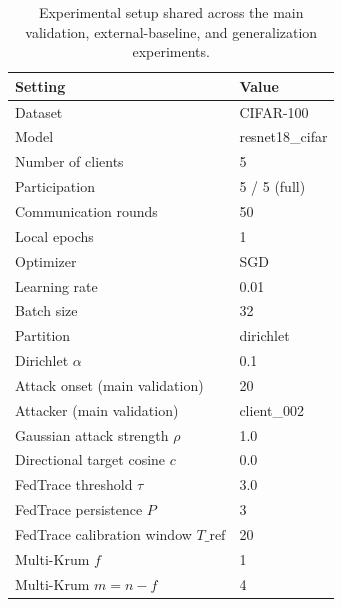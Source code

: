 \begin{table}[t]
\centering
\caption{Experimental setup shared across the main validation, external-baseline, and generalization experiments.}
\label{tab:setup}
\begin{tabular}{lX}
\toprule
Setting & Value \\
\midrule
Dataset & CIFAR-100 \\
Model & resnet18\_cifar \\
Number of clients & 5 \\
Participation & 5 / 5 (full) \\
Communication rounds & 50 \\
Local epochs & 1 \\
Optimizer & SGD \\
Learning rate & 0.01 \\
Batch size & 32 \\
Partition & dirichlet \\
Dirichlet $\alpha$ & 0.1 \\
Attack onset (main validation) & 20 \\
Attacker (main validation) & client\_002 \\
Gaussian attack strength $\rho$ & 1.0 \\
Directional target cosine $c$ & 0.0 \\
FedTrace threshold $\tau$ & 3.0 \\
FedTrace persistence $P$ & 3 \\
FedTrace calibration window $T\_{\mathrm{ref}}$ & 20 \\
Multi-Krum $f$ & 1 \\
Multi-Krum $m = n-f$ & 4 \\
\bottomrule
\end{tabular}
\end{table}
